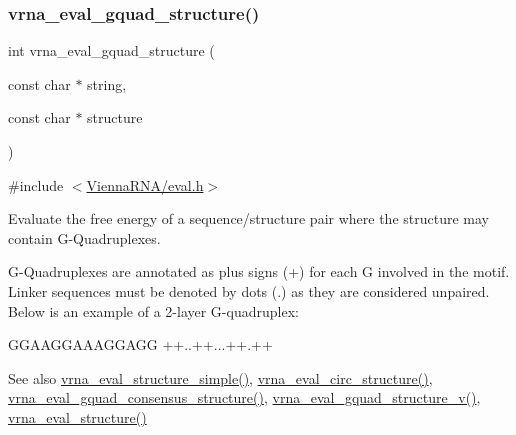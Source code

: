 \subsubsection{\texorpdfstring{vrna\+\_\+eval\+\_\+gquad\+\_\+structure()}{vrna\_eval\_gquad\_structure()}}
{\footnotesize\ttfamily int vrna\+\_\+eval\+\_\+gquad\+\_\+structure (\begin{DoxyParamCaption}\item[{const char $\ast$}]{string,  }\item[{const char $\ast$}]{structure }\end{DoxyParamCaption})}



{\ttfamily \#include $<$\hyperlink{eval_8h}{Vienna\+R\+N\+A/eval.\+h}$>$}



Evaluate the free energy of a sequence/structure pair where the structure may contain G-\/\+Quadruplexes. 

G-\/\+Quadruplexes are annotated as plus signs (\textquotesingle{}+\textquotesingle{}) for each G involved in the motif. Linker sequences must be denoted by dots (\textquotesingle{}.\textquotesingle{}) as they are considered unpaired. Below is an example of a 2-\/layer G-\/quadruplex\+: 
\begin{DoxyCode}
GGAAGGAAAGGAGG
++..++...++.++
\end{DoxyCode}


\begin{DoxySeeAlso}{See also}
\hyperlink{group__eval_ga7e5273464b775d4130245681312c1369}{vrna\+\_\+eval\+\_\+structure\+\_\+simple()}, \hyperlink{group__eval_ga3e05a23ddf9b083f4e69881e440d4866}{vrna\+\_\+eval\+\_\+circ\+\_\+structure()}, \hyperlink{group__eval_gaf09a326b3d57a4b30c27bd0e216198ac}{vrna\+\_\+eval\+\_\+gquad\+\_\+consensus\+\_\+structure()}, \hyperlink{group__eval_gaeaa2bdbc1b5d78c667e735fbdff87fff}{vrna\+\_\+eval\+\_\+gquad\+\_\+structure\+\_\+v()}, \hyperlink{group__eval_ga58f199f1438d794a265f3b27fc8ea631}{vrna\+\_\+eval\+\_\+structure()}
\end{DoxySeeAlso}

